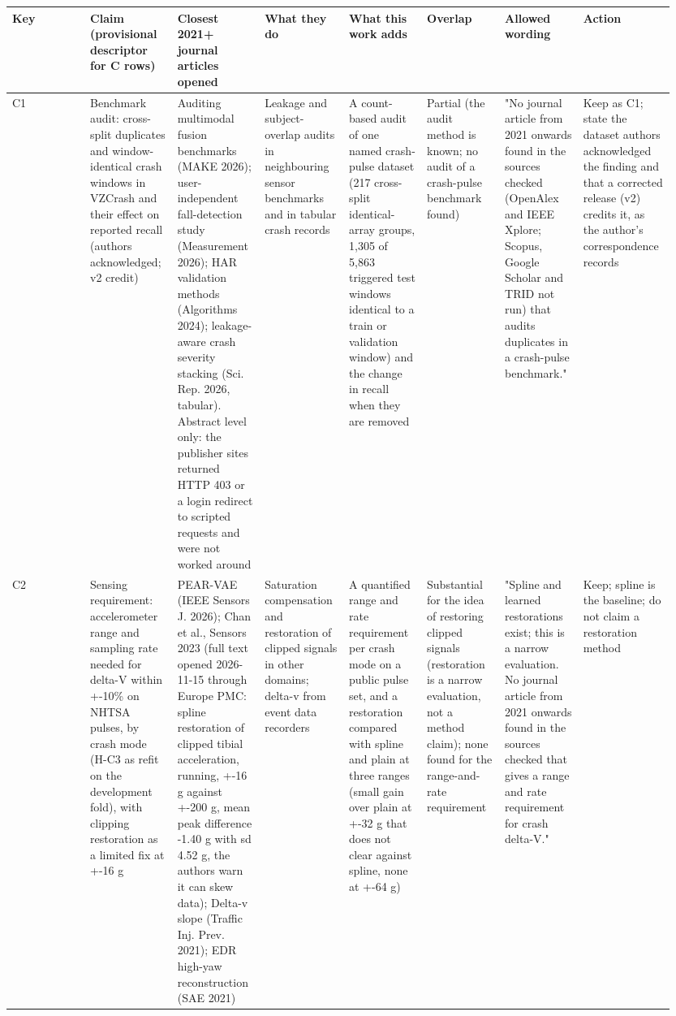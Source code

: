 {\scriptsize\raggedright
\begin{longtable}{p{0.119\linewidth}p{0.119\linewidth}p{0.119\linewidth}p{0.119\linewidth}p{0.119\linewidth}p{0.119\linewidth}p{0.119\linewidth}p{0.119\linewidth}}
\toprule
Key & Claim (provisional descriptor for C rows) & Closest 2021+ journal articles opened & What they do & What this work adds & Overlap & Allowed wording & Action \\
\midrule
\endhead
C1 & Benchmark audit: cross-split duplicates and window-identical crash windows in VZCrash and their effect on reported recall (authors acknowledged; v2 credit) & Auditing multimodal fusion benchmarks (MAKE 2026); user-independent fall-detection study (Measurement 2026); HAR validation methods (Algorithms 2024); leakage-aware crash severity stacking (Sci. Rep. 2026, tabular). Abstract level only: the publisher sites returned HTTP 403 or a login redirect to scripted requests and were not worked around & Leakage and subject-overlap audits in neighbouring sensor benchmarks and in tabular crash records & A count-based audit of one named crash-pulse dataset (217 cross-split identical-array groups, 1,305 of 5,863 triggered test windows identical to a train or validation window) and the change in recall when they are removed & Partial (the audit method is known; no audit of a crash-pulse benchmark found) & "No journal article from 2021 onwards found in the sources checked (OpenAlex and IEEE Xplore; Scopus, Google Scholar and TRID not run) that audits duplicates in a crash-pulse benchmark." & Keep as C1; state the dataset authors acknowledged the finding and that a corrected release (v2) credits it, as the author's correspondence records \\
C2 & Sensing requirement: accelerometer range and sampling rate needed for delta-V within +-10\% on NHTSA pulses, by crash mode (H-C3 as refit on the development fold), with clipping restoration as a limited fix at +-16 g & PEAR-VAE (IEEE Sensors J. 2026); Chan et al., Sensors 2023 (full text opened 2026-11-15 through Europe PMC: spline restoration of clipped tibial acceleration, running, +-16 g against +-200 g, mean peak difference -1.40 g with sd 4.52 g, the authors warn it can skew data); Delta-v slope (Traffic Inj. Prev. 2021); EDR high-yaw reconstruction (SAE 2021) & Saturation compensation and restoration of clipped signals in other domains; delta-v from event data recorders & A quantified range and rate requirement per crash mode on a public pulse set, and a restoration compared with spline and plain at three ranges (small gain over plain at +-32 g that does not clear against spline, none at +-64 g) & Substantial for the idea of restoring clipped signals (restoration is a narrow evaluation, not a method claim); none found for the range-and-rate requirement & "Spline and learned restorations exist; this is a narrow evaluation. No journal article from 2021 onwards found in the sources checked that gives a range and rate requirement for crash delta-V." & Keep; spline is the baseline; do not claim a restoration method \\

\end{longtable}}
